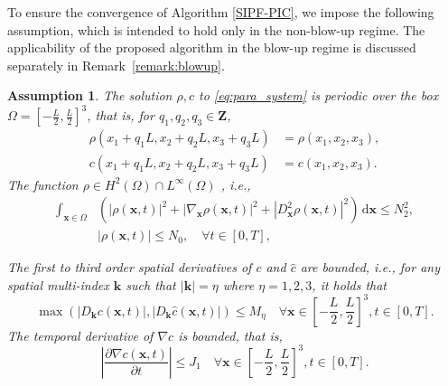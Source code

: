 \documentclass[review,onefignum,onetabnum]{siamart250211}
\newtheorem{assumption}[theorem]{Assumption}
\begin{document}
To ensure the convergence of Algorithm \ref{SIPF-PIC}, we impose the following assumption, which is intended to hold only in the non-blow-up regime. The applicability of the proposed algorithm in the blow-up regime is discussed separately in Remark~\ref{remark:blowup}.
\begin{assumption}
\label{as}
The solution \(\rho, c\) to \eqref{eq:para_system} is periodic over the box\\ \(\Omega=\left[-\frac{L}{2},\frac{L}{2}\right]^3\), that is, for \(q_1,q_2,q_3 \in \mathbf{Z}\),
\begin{equation}
\begin{aligned}
\rho(x_1+q_1 L,x_2+q_2 L,x_3 + q_3 L) &= \rho(x_1,x_2,x_3), \\
c(x_1+q_1 L,x_2+q_2 L,x_3 + q_3 L)    &= c(x_1,x_2,x_3).
\end{aligned}
\label{eq:periodic}
\end{equation}
The function \(\rho \in H^2(\Omega) \cap L^\infty(\Omega)\) , i.e., 
\begin{equation}
\begin{aligned}
\int_{\mathbf{x} \in \Omega}&\left(|\rho(\mathbf{x},t)|^2+ |\nabla_\mathbf{x}\rho(\mathbf{x},t)|^2+|D_\mathbf{x}^2\rho(\mathbf{x},t)|^2\right)\, \mathrm{d}\mathbf{x} \leq N_2^2, \\ 
&|\rho(\mathbf{x},t)|\leq N_0, \quad \forall t \in \left[0,T\right],
\end{aligned}
\end{equation}

The first to third order spatial derivatives of \( c \) and \( \hat{c} \) are bounded, i.e., for any spatial multi-index \( \mathbf{k} \) such that \( |\mathbf{k}| = \eta \) where \(\eta=1,2,3\), it holds that
\begin{equation}
\label{eq:c_smoothness}
\max(|D_{\mathbf{k}} c(\mathbf{x},t)|, |D_{\mathbf{k}} \hat{c}(\mathbf{x},t)|) \leq M_\eta \quad \forall \mathbf{x} \in \left[-\frac{L}{2}, \frac{L}{2}\right]^3,t \in \left[0,T\right].
\end{equation}
The temporal derivative of \(\nabla c\) is bounded, that is,
\begin{equation}
\left| \frac{\partial \nabla c(\mathbf{x},t)}{\partial t} \right| \leq J_1\quad \forall \mathbf{x} \in \left[-\frac{L}{2}, \frac{L}{2}\right]^3,t \in \left[0,T\right].
\end{equation}
\end{assumption}
\end{document}
